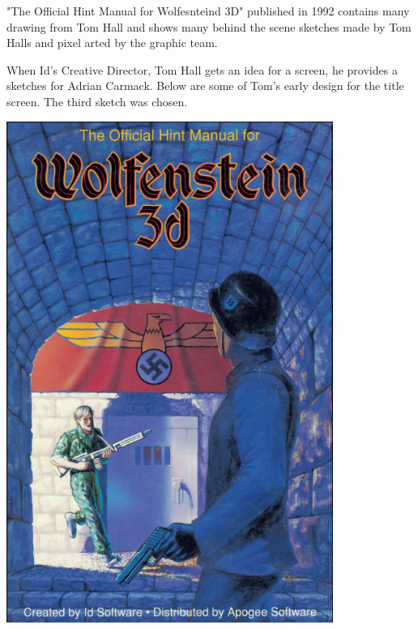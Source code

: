 \documentclass[book.tex]{subfiles}
\begin{document}
\begin{minipage}{0.7\textwidth}
 "The Official Hint Manual for Wolfesnteind 3D" published in 1992 contains many drawing from Tom Hall and shows many behind the scene sketches made by Tom Halls and pixel arted by the graphic team.\\
\par
 \begin{fancyquotes}
When Id's Creative Director, Tom Hall gets an idea for a screen, he provides a sketches for Adrian Carmack. Below are some of Tom's early design for the title screen. The third sketch was chosen.\\
\end{fancyquotes}
\end{minipage}
\begin{minipage}{0.3\textwidth}
\begin{flushright}
\includegraphics[width=0.8\textwidth]{screenshots/hint_manual_cover.png}
\end{flushright}
\end{minipage}
\end{document}
